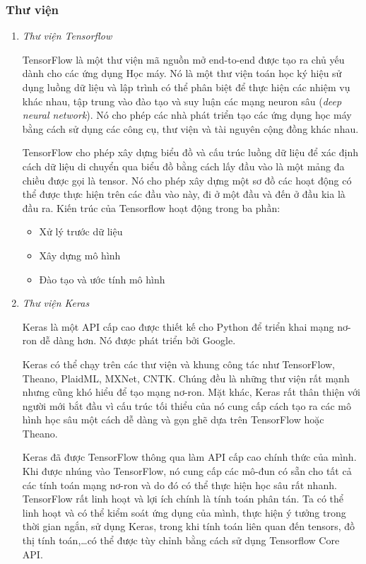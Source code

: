 \subsubsection{Thư viện}
\begin{enumerate}
    \item \textit{Thư viện Tensorflow}

          TensorFlow là một thư viện mã nguồn mở end-to-end được tạo ra chủ yếu dành cho các ứng dụng Học máy. Nó là một thư viện toán học ký hiệu sử dụng luồng dữ liệu và lập trình có thể phân biệt để thực hiện các nhiệm vụ khác nhau, tập trung vào đào tạo và suy luận các mạng neuron sâu (\textit{deep neural network}). Nó cho phép các nhà phát triển tạo các ứng dụng học máy bằng cách sử dụng các công cụ, thư viện và tài nguyên cộng đồng khác nhau\cite{webpage16}.

          TensorFlow cho phép xây dựng biểu đồ và cấu trúc luồng dữ liệu để xác định cách dữ liệu di chuyển qua biểu đồ bằng cách lấy đầu vào là một mảng đa chiều được gọi là tensor. Nó cho phép xây dựng một sơ đồ các hoạt động có thể được thực hiện trên các đầu vào này, đi ở một đầu và đến ở đầu kia là đầu ra.
          Kiến trúc của Tensorflow hoạt động trong ba phần:
          \begin{itemize}
              \item Xử lý trước dữ liệu
              \item Xây dựng mô hình
              \item Đào tạo và ước tính mô hình
          \end{itemize}

    \item \textit{Thư viện Keras}

          Keras là một API cấp cao được thiết kế cho Python để triển khai mạng nơ-ron dễ dàng hơn. Nó được phát triển bởi Google.

          Keras có thể chạy trên các thư viện và khung công tác như TensorFlow, Theano, PlaidML, MXNet, CNTK. Chúng đều là những thư viện rất mạnh nhưng cũng khó hiểu để tạo mạng nơ-ron. Mặt khác, Keras rất thân thiện với người mới bắt đầu vì cấu trúc tối thiểu của nó cung cấp cách tạo ra các mô hình học sâu một cách dễ dàng và gọn ghẽ dựa trên TensorFlow hoặc Theano.

          Keras đã được TensorFlow thông qua làm API cấp cao chính thức của mình. Khi được nhúng vào TensorFlow, nó cung cấp các mô-đun có sẵn cho tất cả các tính toán mạng nơ-ron và do đó có thể thực hiện học sâu rất nhanh. TensorFlow rất linh hoạt và lợi ích chính là tính toán phân tán. Ta có thể linh hoạt và có thể kiểm soát ứng dụng của mình, thực hiện ý tưởng trong thời gian ngắn, sử dụng Keras, trong khi tính toán liên quan đến tensors, đồ thị tính toán,\dots có thể được tùy chỉnh bằng cách sử dụng Tensorflow Core API.


\end{enumerate}
